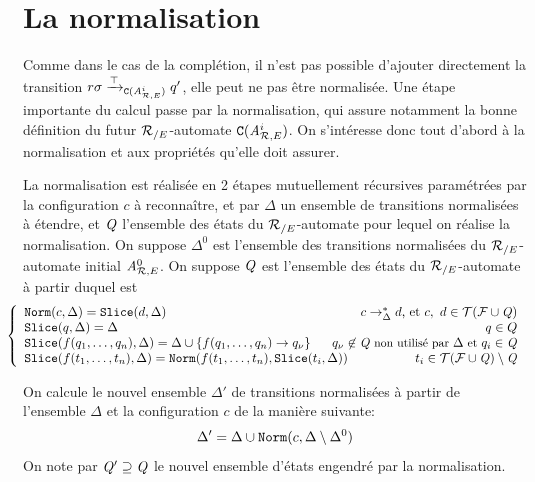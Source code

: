 \section{La normalisation}
Comme dans le cas de la complétion, il n'est pas possible d'ajouter directement
la transition $r\sigma \xrightarrow{\top}_{\mathtt{C}({\mathit A}_{\mathcal R,E}^{i})} q'$, elle peut ne pas être normalisée.
Une étape importante du calcul passe par la normalisation, qui assure notamment la bonne définition
du futur ${\mathcal R_{/E}}$-automate $\mathtt{C}({\mathit A}_{\mathcal R,E}^{i})$. 
On s'intéresse donc tout d'abord à la normalisation et aux propriétés qu'elle doit assurer.

\begin{definition}[Normalisation]
  \label{def:normalisation}
  La normalisation est réalisée en 2 étapes mutuellement récursives
  paramétrées par la configuration $c$ à reconnaître, et par $\Delta$ un ensemble de
  transitions normalisées à étendre, et $\mathit Q$ l'ensemble des états du ${\mathcal R_{/E}}$-automate pour
  lequel on réalise la normalisation. On suppose $\Delta^0$ est l'ensemble des transitions normalisées 
  du ${\mathcal R_{/E}}$-automate initial ${\mathit A}_{\mathcal R,E}^0$. On suppose $\mathit Q$ est l'ensemble des états du ${\mathcal R_{/E}}$-automate
  à partir duquel est 
  \[\hspace{-.5cm}
  \left\{
    \begin{array}{lr}
      \norm(c, \Delta) = \slice(d, \Delta) & c \rw_\Delta^* d\textrm{, et }c,\ d \in \TFQ\\
      \slice(q,\Delta) = \Delta & q \in Q\\
      \slice(f(q_1,\dots, q_n), \Delta) = \Delta \cup \{f(q_1,\dots, q_n) \rw q_\nu\} &\hspace{-1.3cm}
      {\small q_\nu \not\in \Q \textrm{ non utilisé par } \Delta \textrm{ et } q_i \in \Q}\\
      \slice(f(t_1,\dots, t_n), \Delta) = \norm(f(t_1,\dots, t_n), \slice(t_i, \Delta)) & t_i \in \TFQ \setminus \Q\\
    \end{array}
  \right.
  \]

  On calcule le nouvel ensemble $\Delta'$ de transitions normalisées à partir de l'ensemble $\Delta$ 
  et la configuration $c$ de la manière suivante:
  \[ \Delta' = \Delta \cup \mathtt{Norm}(c, \Delta \setminus \Delta^0)  \]
  On note par $\mathit Q' \supseteq \mathit Q$ le nouvel ensemble d'états engendré par la normalisation.

\end{definition}


